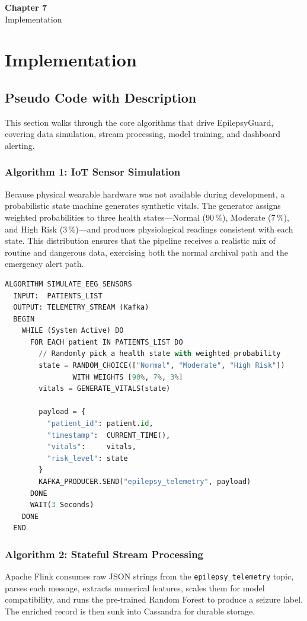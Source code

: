 \documentclass[12pt, a4paper, oneside]{report}
\newcommand{\chapterpage}[2]{
    \cleardoublepage
    \thispagestyle{empty}
    \vspace*{\fill}
    \begin{center}
        \huge \textbf{Chapter #1} \\
        \vspace{1cm}
        \Huge #2
    \end{center}
    \vspace*{\fill}
    \newpage
}
\begin{document}
\chapterpage{7}{Implementation}
\chapter{Implementation}

\section{Pseudo Code with Description}
This section walks through the core algorithms that drive EpilepsyGuard, covering data simulation, stream processing, model training, and dashboard alerting.

\subsection{Algorithm 1: IoT Sensor Simulation}
Because physical wearable hardware was not available during development, a probabilistic state machine generates synthetic vitals. The generator assigns weighted probabilities to three health states---Normal (90\,\%), Moderate (7\,\%), and High Risk (3\,\%)---and produces physiological readings consistent with each state. This distribution ensures that the pipeline receives a realistic mix of routine and dangerous data, exercising both the normal archival path and the emergency alert path.

\begin{lstlisting}[language=Python, caption=Algorithm for IoT sensor simulation.]
ALGORITHM SIMULATE_EEG_SENSORS
  INPUT:  PATIENTS_LIST
  OUTPUT: TELEMETRY_STREAM (Kafka)
  BEGIN
    WHILE (System Active) DO
      FOR EACH patient IN PATIENTS_LIST DO
        // Randomly pick a health state with weighted probability
        state = RANDOM_CHOICE(["Normal", "Moderate", "High Risk"])
                WITH WEIGHTS [90%, 7%, 3%]
        vitals = GENERATE_VITALS(state)

        payload = {
          "patient_id": patient.id,
          "timestamp":  CURRENT_TIME(),
          "vitals":     vitals,
          "risk_level": state
        }
        KAFKA_PRODUCER.SEND("epilepsy_telemetry", payload)
      DONE
      WAIT(3 Seconds)
    DONE
  END
\end{lstlisting}

\subsection{Algorithm 2: Stateful Stream Processing}
Apache Flink consumes raw JSON strings from the \texttt{epilepsy\_telemetry} topic, parses each message, extracts numerical features, scales them for model compatibility, and runs the pre-trained Random Forest to produce a seizure label. The enriched record is then sunk into Cassandra for durable storage.
\end{document}
